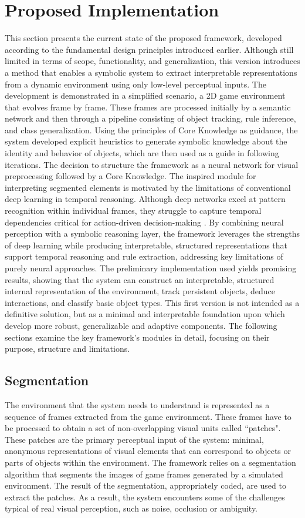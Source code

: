 \documentclass[12pt,a4paper]{report}
\begin{document}
\section{Proposed Implementation}
This section presents the current state of the proposed framework, developed according to the fundamental design principles introduced earlier. Although still limited in terms of scope, functionality, and generalization, this version introduces a method that enables a symbolic system to extract interpretable representations from a dynamic environment using only low-level perceptual inputs. 
The development is demonstrated in a simplified scenario, a 2D game environment that evolves frame by frame. These frames are processed initially by a semantic network and then through a pipeline consisting of object tracking, rule inference, and class generalization. Using the principles of Core Knowledge as guidance, the system developed explicit heuristics to generate symbolic knowledge about the identity and behavior of objects, which are then used as a guide in following iterations.
The decision to structure the framework as a neural network for visual preprocessing followed by a Core Knowledge. The inspired module for interpreting segmented elements is motivated by the limitations of conventional deep learning in temporal reasoning. Although deep networks excel at pattern recognition within individual frames, they struggle to capture temporal dependencies critical for action-driven decision-making \cite{chiave31}. By combining neural perception with a symbolic reasoning layer, the framework leverages the strengths of deep learning while producing interpretable, structured representations that support temporal reasoning and rule extraction, addressing key limitations of purely neural approaches.
The preliminary implementation used yields promising results, showing that the system can construct an interpretable, structured internal representation of the environment, track persistent objects, deduce interactions, and classify basic object types. This first version is not intended as a definitive solution, but as a minimal and interpretable foundation upon which develop more robust, generalizable and adaptive components.
The following sections examine the key framework's modules in detail, focusing on their purpose, structure and limitations.

\subsection{Segmentation}
The environment that the system needs to understand is represented as a sequence of frames extracted from the game environment. These frames have to be processed to obtain a set of non-overlapping visual units called “patches". These patches are the primary perceptual input of the system: minimal, anonymous representations of visual elements that can correspond to objects or parts of objects within the environment.
The framework relies on a segmentation algorithm that segments the images of game frames generated by a simulated environment. The result of the segmentation, appropriately coded, are used to extract the patches. As a result, the system encounters some of the challenges typical of real visual perception, such as noise, occlusion or ambiguity. 
\end{document}
